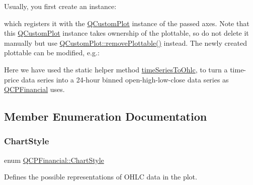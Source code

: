 Usually, you first create an instance\+:


\begin{DoxyCodeInclude}{0}
\end{DoxyCodeInclude}
which registers it with the \mbox{\hyperlink{class_q_custom_plot}{Q\+Custom\+Plot}} instance of the passed axes. Note that this \mbox{\hyperlink{class_q_custom_plot}{Q\+Custom\+Plot}} instance takes ownership of the plottable, so do not delete it manually but use \mbox{\hyperlink{class_q_custom_plot_af3dafd56884208474f311d6226513ab2}{Q\+Custom\+Plot\+::remove\+Plottable()}} instead. The newly created plottable can be modified, e.\+g.\+:


\begin{DoxyCodeInclude}{0}
\end{DoxyCodeInclude}
Here we have used the static helper method \mbox{\hyperlink{class_q_c_p_financial_a9a058c035040d3939b8884f4aaccb1a7}{time\+Series\+To\+Ohlc}}, to turn a time-\/price data series into a 24-\/hour binned open-\/high-\/low-\/close data series as \mbox{\hyperlink{class_q_c_p_financial}{Q\+C\+P\+Financial}} uses. 

\subsection{Member Enumeration Documentation}
\mbox{\label{class_q_c_p_financial_a0f800e21ee98d646dfc6f8f89d10ebfb}} 
\subsubsection{\texorpdfstring{ChartStyle}{ChartStyle}}
{\footnotesize\ttfamily enum \mbox{\hyperlink{class_q_c_p_financial_a0f800e21ee98d646dfc6f8f89d10ebfb}{Q\+C\+P\+Financial\+::\+Chart\+Style}}}

Defines the possible representations of O\+H\+LC data in the plot.

